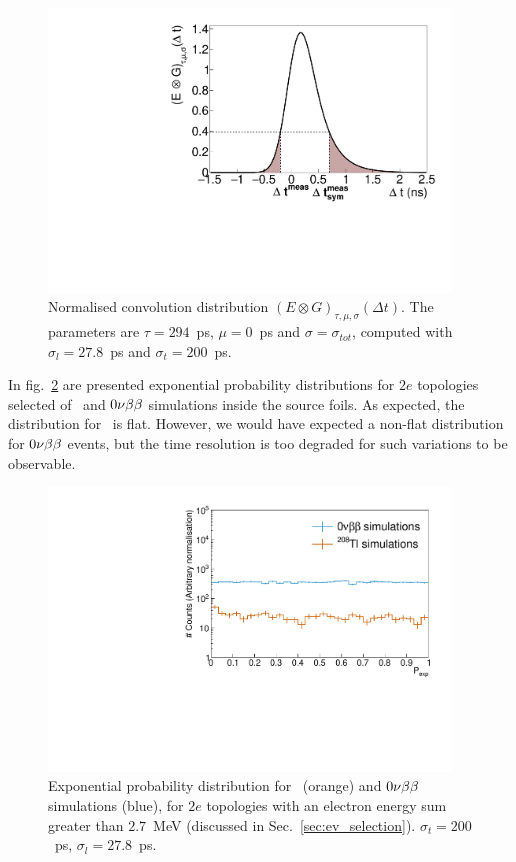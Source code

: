 \begin{figure}[!h]
  \centering
  \includegraphics[width=0.95\textwidth]{timedifference/fig_timediff/proba_expo_test.pdf}
  \caption{Normalised convolution distribution ${(E \otimes G)_{\tau,\mu,\sigma}(\Delta t)}$.
    The parameters are $\tau=294$~ps, $\mu=0$~ps and $\sigma=\sigma_{tot}$, computed with $\sigma_{l}=27.8$~ps and $\sigma_{t}=200$~ps.
    \label{fig:Pexp}}
\end{figure}

In fig.~\ref{fig:Pexp_Tl} are presented exponential probability distributions for $2e$ topologies selected of \Tl\ and $0\nu\beta\beta$ simulations inside the source foils.
As expected, the distribution for \Tl\ is flat.
However, we would have expected a non-flat distribution for $0\nu\beta\beta$ events, but the time resolution is too degraded for such variations to be observable.
\begin{figure}[!h]
  \centering
  \includegraphics[width=0.95\textwidth]{timedifference/fig_timediff/proba_expo_400.pdf}
  \caption{Exponential probability distribution for \Tl\ (orange) and $0\nu\beta\beta$ simulations (blue), for $2e$ topologies with an electron energy sum greater than $2.7$~MeV (discussed in Sec.~\ref{sec:ev_selection}).
    $\sigma_{t}=200$~ps, $\sigma_{l}=27.8$~ps.
    \label{fig:Pexp_Tl}}
\end{figure}

